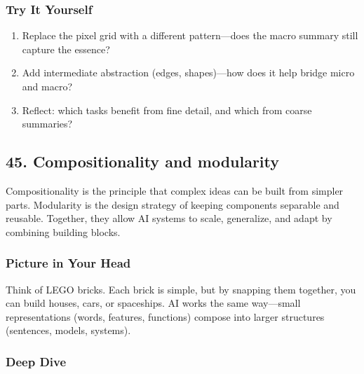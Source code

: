 \documentclass[
  letterpaper,
  DIV=11,
  numbers=noendperiod]{scrreprt}
\providecommand{\tightlist}{%
  \setlength{\itemsep}{0pt}\setlength{\parskip}{0pt}}
\begin{document}
\subsubsection{Try It Yourself}\label{try-it-yourself-43}

\begin{enumerate}
\def\labelenumi{\arabic{enumi}.}
\tightlist
\item
  Replace the pixel grid with a different pattern---does the macro
  summary still capture the essence?
\item
  Add intermediate abstraction (edges, shapes)---how does it help bridge
  micro and macro?
\item
  Reflect: which tasks benefit from fine detail, and which from coarse
  summaries?
\end{enumerate}

\subsection{45. Compositionality and
modularity}\label{compositionality-and-modularity}

Compositionality is the principle that complex ideas can be built from
simpler parts. Modularity is the design strategy of keeping components
separable and reusable. Together, they allow AI systems to scale,
generalize, and adapt by combining building blocks.

\subsubsection{Picture in Your Head}\label{picture-in-your-head-44}

Think of LEGO bricks. Each brick is simple, but by snapping them
together, you can build houses, cars, or spaceships. AI works the same
way---small representations (words, features, functions) compose into
larger structures (sentences, models, systems).

\subsubsection{Deep Dive}\label{deep-dive-44}
\end{document}
